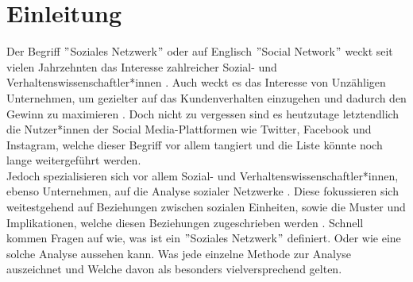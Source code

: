 \chapter{Einleitung}\label{ch:einleitung}
Der Begriff $"$Soziales Netzwerk$"$ oder auf Englisch $"$Social Network$"$ weckt seit vielen Jahrzehnten das Interesse zahlreicher Sozial- und Verhaltenswissenschaftler*innen \cite{SNAIntroduction}. Auch weckt es das Interesse von Unzähligen Unternehmen, um gezielter auf das Kundenverhalten einzugehen und dadurch den Gewinn zu maximieren \cite{CompanySNA}. Doch nicht zu vergessen sind es heutzutage letztendlich die Nutzer*innen der Social Media-Plattformen wie Twitter, Facebook und Instagram, welche dieser Begriff vor allem tangiert und die Liste könnte noch lange weitergeführt werden.\\
Jedoch spezialisieren sich vor allem Sozial- und Verhaltenswissenschaftler*innen, ebenso Unternehmen, auf die Analyse sozialer Netzwerke \cite{SNAIntroduction}\cite{CompanySNA}. Diese fokussieren sich weitestgehend auf Beziehungen zwischen sozialen Einheiten, sowie die Muster und Implikationen, welche diesen Beziehungen zugeschrieben werden \cite{networkPattern}.
Schnell kommen Fragen auf wie, was ist ein $"$Soziales Netzwerk$"$ definiert. Oder wie eine solche Analyse aussehen kann. Was jede einzelne Methode zur Analyse auszeichnet und Welche davon als besonders vielversprechend gelten.


